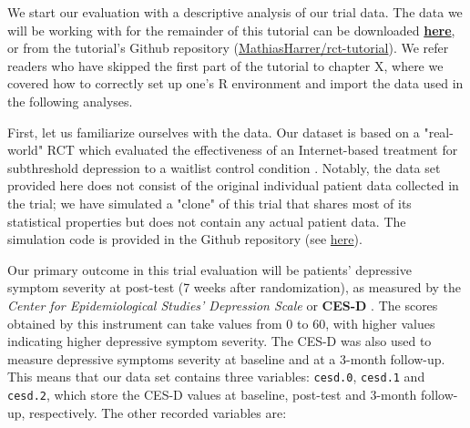 We start our evaluation with a descriptive analysis of our trial data. The data we will be working with for the remainder of this tutorial can be downloaded \href{https://github.com/MathiasHarrer/rct-tutorial/blob/main/data/data.xlsx?raw=true}{\textbf{here}}, or from the tutorial's Github repository (\href{https://github.com/MathiasHarrer/rct-tutorial}{MathiasHarrer/rct-tutorial}). We refer readers who have skipped the first part of the tutorial to chapter X, where we covered how to correctly set up one's \textsf{R} environment and import the data used in the following analyses. 

First, let us familiarize ourselves with the data. Our dataset is based on a "real-world" RCT which evaluated the effectiveness of an Internet-based treatment for subthreshold depression to a waitlist control condition \citep{ebert2018effectiveness}. Notably, the data set provided here does not consist of the original individual patient data collected in the trial; we have simulated a "clone" of this trial that shares most of its statistical properties but does not contain any actual patient data. The simulation code is provided in the Github repository (see \href{https://raw.githubusercontent.com/MathiasHarrer/rct-tutorial/main/code/data_simulation}{here}). 

Our primary outcome in this trial evaluation will be patients' depressive symptom severity at post-test (7 weeks after randomization), as measured by the \emph{Center for Epidemiological Studies' Depression Scale} or \textbf{CES-D} \citep{Radloff1977}. The scores obtained by this instrument can take values from 0 to 60, with higher values indicating higher depressive symptom severity. The CES-D was also used to measure depressive symptoms severity at baseline and at a 3-month follow-up. This means that our data set contains three variables: \texttt{cesd.0}, \texttt{cesd.1} and \texttt{cesd.2}, which store the CES-D values at baseline, post-test and 3-month follow-up, respectively. The other recorded variables are:

